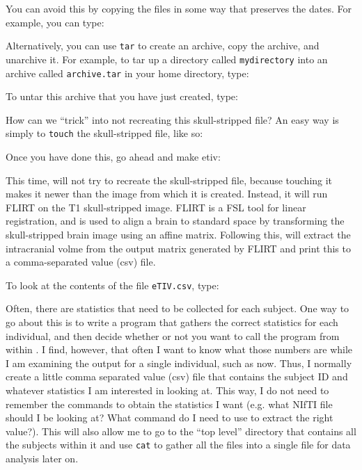 You can avoid this by copying the files in some way that preserves the dates. For example,
you can type:

Alternatively, you can use \texttt{tar} to create an archive, copy the archive, and unarchive it.
For example, to tar up a directory called \texttt{mydirectory} into an archive called \texttt{archive.tar} in your home directory, type:

To untar this archive that you have just created, type:

How can we ``trick'' \maken{} into not recreating this skull-stripped file? An easy way is simply to \texttt{touch} the skull-stripped file, like so:

Once you have done this, go ahead and make etiv:

This time, \maken{} will not try to recreate the skull-stripped file, because touching it makes it newer than the image from which it is created. Instead, it will run FLIRT on the T1 skull-stripped image. FLIRT is a FSL tool for linear registration, and is used to align a brain to standard space by transforming the skull-stripped brain image using an affine matrix. Following this, \maken{} will extract the intracranial volme from the output matrix generated by FLIRT and print this to a comma-separated value (csv) file.

To look at the contents of the file \texttt{eTIV.csv}, type:

Often, there are statistics that need to be collected for each subject. One way to go about this is to write a program that gathers the correct statistics for each individual, and then decide whether or not you want to call the program from within \maken{}. I find, however, that often I want to know what those numbers are while I am examining the output for a single individual, such as now. Thus, I normally create a little comma separated value (csv) file that contains the subject ID and whatever statistics I am interested in looking at. This way, I do not need to remember the commands to obtain the statistics I want (e.g. what NIfTI file should I be looking at? What command do I need to use to extract the right value?). This will also allow me to go to the ``top level'' directory that contains all the subjects within it and use \texttt{cat} to gather all the files into a single file for data analysis later on.


